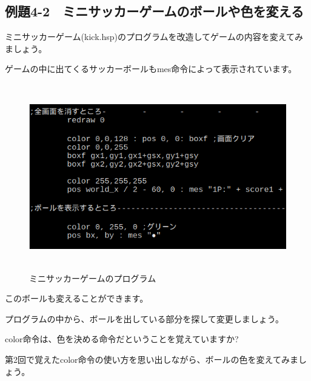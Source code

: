 \newpage
\subsection{例題4-2　ミニサッカーゲームのボールや色を変える}

\begin{description}
    \item {}
\end{description}

ミニサッカーゲーム(kick.hsp)のプログラムを改造してゲームの内容を変えてみましょう。

ゲームの中に出てくるサッカーボールもmes命令によって表示されています。


\begin{figure}[H]
    \begin{center}
      \includegraphics[keepaspectratio,width=14.499cm,height=8.123cm]{text04-img/text04-img008.png}
      \caption{ミニサッカーゲームのプログラム}
    \end{center}
    \label{fig:prog_menu}
\end{figure}


このボールも変えることができます。

プログラムの中から、ボールを出している部分を探して変更しましょう。



color命令は、色を決める命令だということを覚えていますか?

第2回で覚えたcolor命令の使い方を思い出しながら、ボールの色を変えてみましょう。


